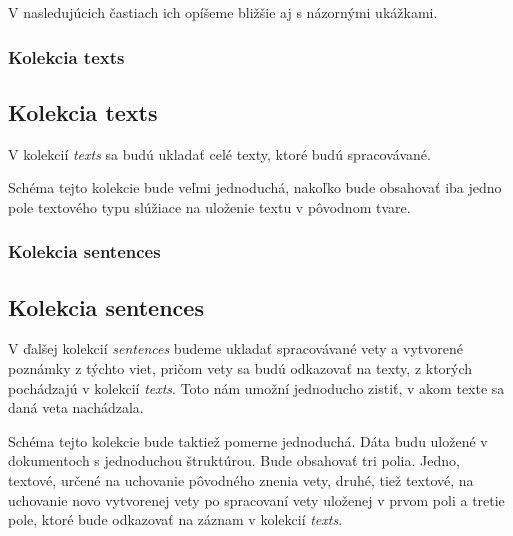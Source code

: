 V nasledujúcich častiach ich opíšeme bližšie aj s názornými ukážkami.

%
%
{
	\subsubsection{Kolekcia texts}
}
{
	\subsection{Kolekcia texts}
}
V kolekcií \textit{texts} sa budú ukladať celé texty, ktoré budú spracovávané. 

Schéma tejto kolekcie bude veľmi jednoduchá, nakoľko bude obsahovať iba jedno pole textového typu slúžiace na uloženie textu v pôvodnom tvare.

%
%
{
	\subsubsection{Kolekcia sentences}
}
{
	\subsection{Kolekcia sentences}
}
V ďalšej kolekcií \textit{sentences} budeme ukladať spracovávané vety a vytvorené poznámky z týchto viet, pričom vety sa budú odkazovať na texty, z ktorých pochádzajú v kolekcií \textit{texts}. Toto nám umožní jednoducho zistiť, v akom texte sa daná veta nachádzala.

Schéma tejto kolekcie bude taktiež pomerne jednoduchá. Dáta budu uložené v dokumentoch s jednoduchou štruktúrou. Bude obsahovať tri polia. Jedno, textové, určené na uchovanie pôvodného znenia vety, druhé, tiež textové, na uchovanie novo vytvorenej vety po spracovaní vety uloženej v prvom poli a tretie pole, ktoré bude odkazovať na záznam v kolekcií \textit{texts}.

